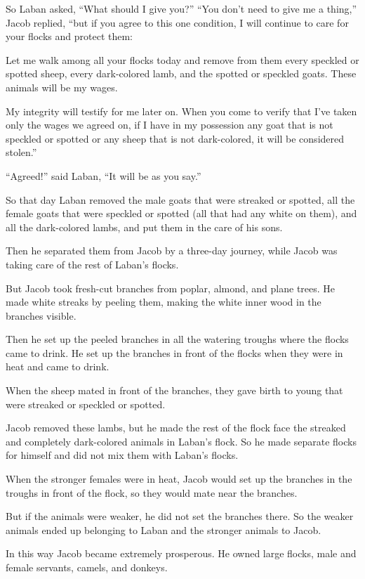 \begin{scripture}
 So Laban asked, ``What should I give you?'' ``You don't need to give me a thing,'' Jacob replied, ``but if you agree to this one condition, I will continue to care for your flocks and protect them:
 Let me walk among all your flocks today and remove from them every speckled or spotted sheep, every dark-colored lamb, and the spotted or speckled goats. These animals will be my wages.
 My integrity will testify for me later on. When you come to verify that I've taken only the wages we agreed on, if I have in my possession any goat that is not speckled or spotted or any sheep that is not dark-colored, it will be considered stolen.''
 ``Agreed!'' said Laban, ``It will be as you say.''
\everypar{}

 So that day Laban removed the male goats that were streaked or spotted, all the female goats that were speckled or spotted (all that had any white on them), and all the dark-colored lambs, and put them in the care of his sons.
 Then he separated them from Jacob by a three-day journey, while Jacob was taking care of the rest of Laban's flocks.
\everypar{}

 But Jacob took fresh-cut branches from poplar, almond, and plane trees. He made white streaks by peeling them, making the white inner wood in the branches visible.
 Then he set up the peeled branches in all the watering troughs where the flocks came to drink. He set up the branches in front of the flocks when they were in heat and came to drink.
 When the sheep mated in front of the branches, they gave birth to young that were streaked or speckled or spotted.
 Jacob removed these lambs, but he made the rest of the flock face the streaked and completely dark-colored animals in Laban's flock. So he made separate flocks for himself and did not mix them with Laban's flocks.
 When the stronger females were in heat, Jacob would set up the branches in the troughs in front of the flock, so they would mate near the branches.
 But if the animals were weaker, he did not set the branches there. So the weaker animals ended up belonging to Laban and the stronger animals to Jacob.
 In this way Jacob became extremely prosperous. He owned large flocks, male and female servants, camels, and donkeys.


\end{scripture}
